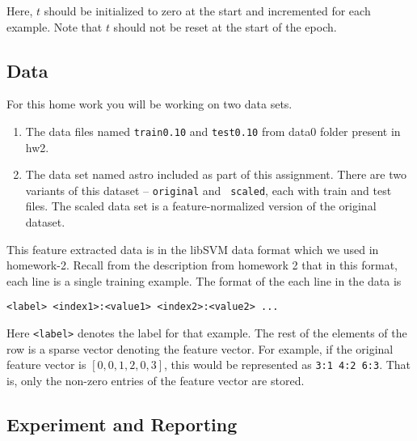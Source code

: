 Here, $t$ should be initialized to zero at the start and incremented
for each example. Note that $t$ should not be reset at the start of
the epoch.

\subsection*{Data}

For this home work you will be working on two data sets.
\begin{enumerate}
\item The data files named {\tt train0.10} and {\tt test0.10} from
  data0 folder present in hw2.
\item The data set named astro included as part of this assignment.
  There are two variants of this dataset -- {\tt original} and {\tt
    scaled}, each with train and test files. The scaled data set is a
  feature-normalized version of the original dataset.
\end{enumerate}

This feature extracted data is in the libSVM data format which we used
in homework-2. Recall from the description from homework 2 that in
this format, each line is a single training example. The format of the
each line in the data is

{\tt <label> <index1>:<value1> <index2>:<value2> ...}

Here {\tt <label>} denotes the label for that example. The rest of the
elements of the row is a sparse vector denoting the feature vector.
For example, if the original feature vector is $[0, 0, 1, 2, 0, 3]$,
this would be represented as {\tt 3:1 4:2 6:3}. That is, only the
non-zero entries of the feature vector are stored.

\subsection*{Experiment and Reporting}

